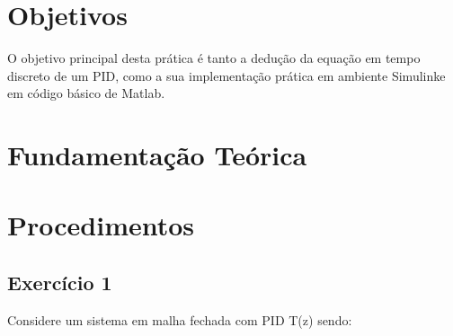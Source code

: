 \section{Objetivos}
O objetivo principal desta prática é tanto a dedução da equação em tempo discreto de um PID, como a sua implementação prática em ambiente Simulink\textregistered e em código básico de Matlab\textregistered.

\section{Fundamentação Teórica}



\section{Procedimentos}
\subsection{Exercício 1}
Considere um sistema em malha fechada com PID T(z) sendo:


